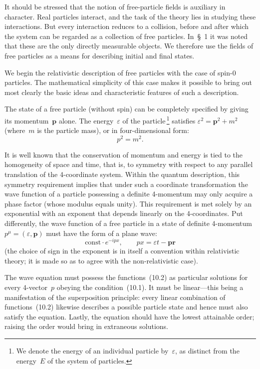 It should be stressed that the notion of free-particle fields is auxiliary in character. Real particles interact, and the task of the theory lies in studying these interactions. But every interaction reduces to a collision, before and after which the system can be regarded as a collection of free particles. In~\S~1 it was noted that these are the only directly measurable objects. We therefore use the fields of free particles as a means for describing initial and final states.

We begin the relativistic description of free particles with the case of spin-0 particles. The mathematical simplicity of this case makes it possible to bring out most clearly the basic ideas and characteristic features of such a description.

The state of a free particle (without spin) can be completely specified by giving its momentum~$\mathbf{p}$ alone. The energy~$\varepsilon$ of the particle\,\footnote{We denote the energy of an individual particle by~$\varepsilon$, as distinct from the energy~$E$ of the system of particles.} satisfies $\varepsilon^2 = \mathbf{p}^2 + m^2$ (where~$m$ is the particle mass), or in four-dimensional form:
\begin{equation}
p^2 = m^2.
\tag{10.1}
\end{equation}

It is well known that the conservation of momentum and energy is tied to the homogeneity of space and time, that is, to symmetry with respect to any parallel translation of the 4-coordinate system. Within the quantum description, this symmetry requirement implies that under such a coordinate transformation the wave function of a particle possessing a definite 4-momentum may only acquire a phase factor (whose modulus equals unity). This requirement is met solely by an exponential with an exponent that depends linearly on the 4-coordinates. Put differently, the wave function of a free particle in a state of definite 4-momentum $p^\mu = (\varepsilon, \mathbf{p})$ must have the form of a plane wave:
\begin{equation}
\text{const} \cdot e^{-ipx}, \qquad px = \varepsilon t - \mathbf{p}\mathbf{r}
\tag{10.2}
\end{equation}
(the choice of sign in the exponent is in itself a convention within relativistic theory; it is made so as to agree with the non-relativistic case).

The wave equation must possess the functions~(10.2) as particular solutions for every 4-vector~$p$ obeying the condition~(10.1). It must be linear---this being a manifestation of the superposition principle: every linear combination of functions~(10.2) likewise describes a possible particle state and hence must also satisfy the equation. Lastly, the equation should have the lowest attainable order; raising the order would bring in extraneous solutions.

